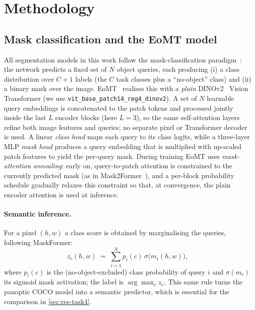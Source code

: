 \section{Methodology}
\label{sec:method}

\subsection{Mask classification and the EoMT model}
All segmentation models in this work follow the mask-classification
paradigm~\cite{maskformer}: the network predicts a fixed set of $N$ object
queries, each producing (i) a class distribution over $C{+}1$ labels (the
$C$ task classes plus a ``no-object'' class) and (ii) a binary mask over the
image. EoMT~\cite{eomt} realises this with a \emph{plain} DINOv2~\cite{dinov2}
Vision Transformer (we use \texttt{vit\_base\_patch14\_reg4\_dinov2}). A set
of $N$ learnable query embeddings is concatenated to the patch tokens and
processed jointly inside the last $L$ encoder blocks (here $L{=}3$), so the
same self-attention layers refine both image features and queries; no
separate pixel or Transformer decoder is used. A linear \emph{class head}
maps each query to its class logits, while a three-layer MLP \emph{mask head}
produces a query embedding that is multiplied with up-scaled patch features
to yield the per-query mask. During training EoMT uses \emph{mask-attention
annealing}: early on, query-to-patch attention is constrained to the
currently predicted mask (as in Mask2Former~\cite{mask2former}), and a
per-block probability schedule gradually relaxes this constraint so that, at
convergence, the plain encoder attention is used at inference.

\paragraph{Semantic inference.}
For a pixel $(h,w)$ a class score is obtained by marginalising the queries,
following MaskFormer:
\begin{equation}
  z_c(h,w) \;=\; \sum_{i=1}^{N} p_i(c)\, \sigma\big(m_i(h,w)\big),
  \label{eq:seminf}
\end{equation}
where $p_i(c)$ is the (no-object-excluded) class probability of query $i$ and
$\sigma(m_i)$ its sigmoid mask activation; the label is $\arg\max_c z_c$. This
same rule turns the panoptic COCO model into a semantic predictor, which is
essential for the comparison in \cref{sec:res-task4}.

